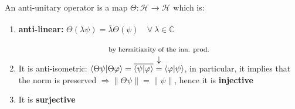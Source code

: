 \documentclass[../main.tex]{subfiles}
\begin{document}
\begin{definition}
An anti-unitary operator is a map $\Theta:\mathcal{H}\xrightarrow[]{}\mathcal{H}$ which is:
\begin{enumerate}
    \item \textbf{anti-linear:} $\Theta(\lambda\psi)=\overline{\lambda}\Theta(\psi) \quad \forall \ \lambda \in \mathbb{C}$
    \item It is anti-isometric: $\langle\Theta\psi|\Theta\varphi\rangle=\overline{\langle\psi|\varphi\rangle}\overset{\mathclap{\tikz \node {$\downarrow$} node [above=1.25ex] {\footnotesize by hermitianity of the inn. prod.};}}{=}\langle\varphi|\psi\rangle$, in particular, it implies that the norm is preserved $\Rightarrow\lVert\Theta\psi\rVert=\lVert\psi\rVert$, hence it is \textbf{injective}
    \item It is \textbf{surjective} 
\end{enumerate}
\end{definition}
\end{document}
